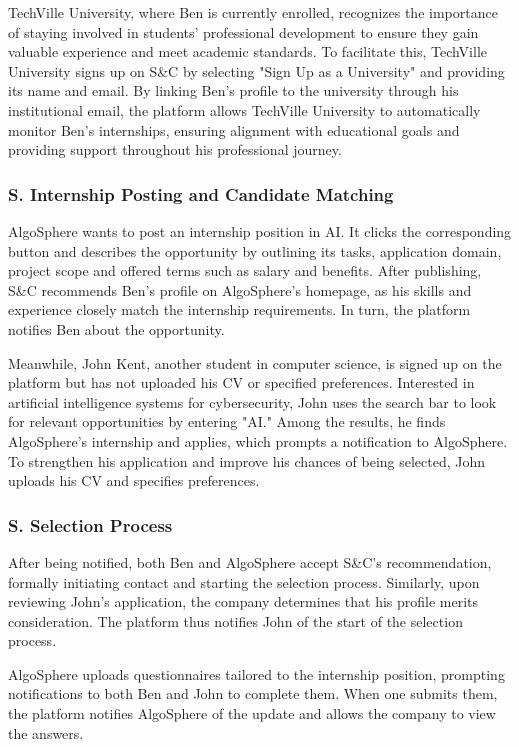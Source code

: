 TechVille University, where Ben is currently enrolled, recognizes the importance of staying involved in students’ professional development to ensure they gain valuable experience and meet academic standards.
To facilitate this, TechVille University signs up on S\&C by selecting "Sign Up as a University" and providing its name and email.
By linking Ben’s profile to the university through his institutional email, the platform allows TechVille University to automatically monitor Ben’s internships, ensuring alignment with educational goals and providing support throughout his professional journey.

\subsubsection*{S\sco. Internship Posting and Candidate Matching}
AlgoSphere wants to post an internship position in AI. It clicks the corresponding button and describes the opportunity by outlining its tasks, application domain, project scope and offered terms such as salary and benefits.
After publishing, S\&C recommends Ben’s profile on AlgoSphere’s homepage, as his skills and experience closely match the internship requirements.
In turn, the platform notifies Ben about the opportunity.

Meanwhile, John Kent, another student in computer science, is signed up on the platform but has not uploaded his CV or specified preferences.
Interested in artificial intelligence systems for cybersecurity, John uses the search bar to look for relevant opportunities by entering "AI."
Among the results, he finds AlgoSphere’s internship and applies, which prompts a notification to AlgoSphere.
To strengthen his application and improve his chances of being selected, John uploads his CV and specifies preferences.

\subsubsection*{S\sco. Selection Process}
After being notified, both Ben and AlgoSphere accept S\&C's recommendation, formally initiating contact and starting the selection process.
Similarly, upon reviewing John’s application, the company determines that his profile merits consideration.
The platform thus notifies John of the start of the selection process.

AlgoSphere uploads questionnaires tailored to the internship position, prompting notifications to both Ben and John to complete them.
When one submits them, the platform notifies AlgoSphere of the update and allows the company to view the answers.

